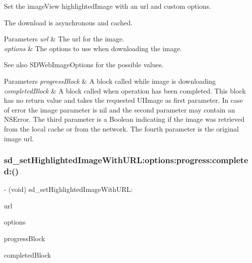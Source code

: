 Set the image\+View {\ttfamily highlighted\+Image} with an {\ttfamily url} and custom options.

The download is asynchronous and cached.


\begin{DoxyParams}{Parameters}
{\em url} & The url for the image. \\
\hline
{\em options} & The options to use when downloading the image. \\
\hline
\end{DoxyParams}
\begin{DoxySeeAlso}{See also}
S\+D\+Web\+Image\+Options for the possible values. 
\end{DoxySeeAlso}

\begin{DoxyParams}{Parameters}
{\em progress\+Block} & A block called while image is downloading \\
\hline
{\em completed\+Block} & A block called when operation has been completed. This block has no return value and takes the requested U\+I\+Image as first parameter. In case of error the image parameter is nil and the second parameter may contain an N\+S\+Error. The third parameter is a Boolean indicating if the image was retrieved from the local cache or from the network. The fourth parameter is the original image url. \\
\hline
\end{DoxyParams}
\mbox{\label{category_u_i_image_view_07_highlighted_web_cache_08_a06bdae01c3cfc17896de4b8d3c33702d}} 
\subsubsection{\texorpdfstring{sd\+\_\+set\+Highlighted\+Image\+With\+U\+R\+L\+:options\+:progress\+:completed\+:()}{sd\_setHighlightedImageWithURL:options:progress:completed:()}\hspace{0.1cm}{\footnotesize\ttfamily [3/3]}}
{\footnotesize\ttfamily -\/ (void) sd\+\_\+set\+Highlighted\+Image\+With\+U\+R\+L\+: \begin{DoxyParamCaption}\item[{(N\+S\+U\+RL $\ast$)}]{url }\item[{options:(S\+D\+Web\+Image\+Options)}]{options }\item[{progress:(S\+D\+Web\+Image\+Downloader\+Progress\+Block)}]{progress\+Block }\item[{completed:(S\+D\+Web\+Image\+Completion\+Block)}]{completed\+Block }\end{DoxyParamCaption}}

